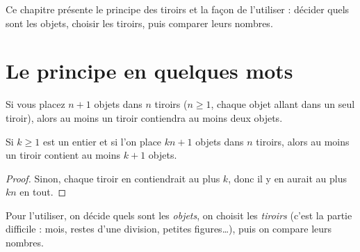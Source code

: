 \documentclass[11pt]{article}
\begin{document}

Ce chapitre présente le principe des tiroirs et la façon de l'utiliser : décider quels sont les objets, choisir les tiroirs, puis comparer leurs nombres.

\section{Le principe en quelques mots}\label{sec:principe}

\begin{theoreme}
Si vous placez \( n+1 \) objets dans \( n \) tiroirs (\( n \geq 1 \), chaque objet allant dans un seul tiroir), alors au moins un tiroir contiendra au moins deux objets.
\end{theoreme}

\begin{proposition}
Si \( k \geq 1 \) est un entier et si l'on place \( kn+1 \) objets dans \( n \) tiroirs, alors au moins un tiroir contient au moins \( k+1 \) objets.
\end{proposition}

\begin{proof}
Sinon, chaque tiroir en contiendrait au plus \( k \), donc il y en aurait au plus \( kn \) en tout.
\end{proof}

\begin{methode}
Pour l'utiliser, on décide quels sont les \emph{objets}, on choisit les \emph{tiroirs} (c'est la partie difficile : mois, restes d'une division, petites figures\ldots), puis on compare leurs nombres.
\end{methode}
\end{document}
